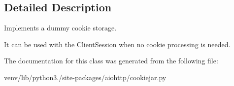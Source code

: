 \subsection{Detailed Description}
\begin{DoxyVerb}Implements a dummy cookie storage.

It can be used with the ClientSession when no cookie processing is needed.\end{DoxyVerb}
 

The documentation for this class was generated from the following file\+:\begin{DoxyCompactItemize}
\item 
venv/lib/python3./site-\/packages/aiohttp/cookiejar.\+py\end{DoxyCompactItemize}
